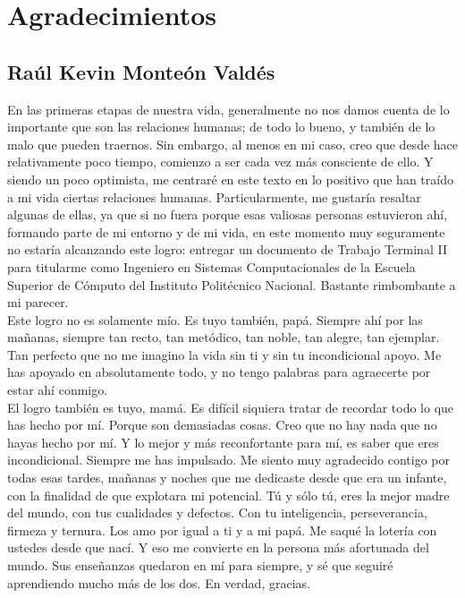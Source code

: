 \newpage
\section{Agradecimientos}
\subsection{Raúl Kevin Monteón Valdés}
En las primeras etapas de nuestra vida, generalmente no nos damos cuenta de lo importante que son las relaciones humanas; de todo lo bueno, y también de lo malo que pueden traernos. Sin embargo, al menos en mi caso, creo que desde hace relativamente poco tiempo, comienzo a ser cada vez más consciente de ello. Y siendo un poco optimista, me centraré en este texto en lo positivo que han traído a mi vida ciertas relaciones humanas. Particularmente, me gustaría resaltar algunas de ellas, ya que si no fuera porque esas valiosas personas estuvieron ahí, formando parte de mi entorno y de mi vida, en este momento muy seguramente no estaría alcanzando este logro: entregar un documento de Trabajo Terminal II para titularme como Ingeniero en Sistemas Computacionales de la Escuela Superior de Cómputo del Instituto Politécnico Nacional. Bastante rimbombante a mi parecer.\\

Este logro no es solamente mío. Es tuyo también, papá. Siempre ahí por las mañanas, siempre tan recto, tan metódico, tan noble, tan alegre, tan ejemplar. Tan perfecto que no me imagino la vida sin ti y sin tu incondicional apoyo. Me has apoyado en absolutamente todo, y no tengo palabras para agraecerte por estar ahí conmigo.\\

El logro también es tuyo, mamá. Es difícil siquiera tratar de recordar todo lo que has hecho por mí. Porque son demasiadas cosas. Creo que no hay nada que no hayas hecho por mí. Y lo mejor y más reconfortante para mí, es saber que eres incondicional. Siempre me has impulsado. Me siento muy agradecido contigo por todas esas tardes, mañanas y noches que me dedicaste desde que era un infante, con la finalidad de que explotara mi potencial. Tú y sólo tú, eres la mejor madre del mundo, con tus cualidades y defectos. Con tu inteligencia, perseverancia, firmeza y ternura. Los amo por igual a ti y a mi papá. Me saqué la lotería con ustedes desde que nací. Y eso me convierte en la persona más afortunada del mundo. Sus enseñanzas quedaron en mí para siempre, y sé que seguiré aprendiendo mucho más de los dos. En verdad, gracias.\\

